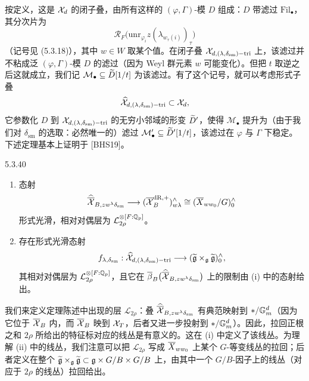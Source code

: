 按定义，这是 $\mathcal{X}_d$ 的闭子叠，由所有这样的 $(\varphi,\Gamma)$-模 $D$ 组成：$D$ 带滤过 $\mathrm{Fil}_\bullet$，其分次片为
\[
\mathcal{R}_F\bigl(\mathrm{unr}_{\varphi_i}z(\lambda_{w_\tau(i)})_\tau\bigr)
\]
（记号见 (5.3.18)），其中 $w\in W$ 取某个值。在闭子叠 $\mathcal{X}_{d,(\lambda,\delta_{\mathrm{sm}})-\mathrm{tri}}$ 上，该滤过并不粘成泛 $(\varphi,\Gamma)$-模 $D$ 的滤过（因为 Weyl 群元素 $w$ 可能变化）。但把 $t$ 取逆之后这就成立，我们记 $\mathcal{M}_\bullet\subseteq\widetilde D[1/t]$ 为该滤过。有了这个记号，就可以考虑形式子叠
\[
\widehat{\mathcal{X}}_{d,(\lambda,\delta_{\mathrm{sm}})-\mathrm{tri}}\subset\mathcal{X}_d,
\]
它参数化 $D$ 到 $\mathcal{X}_{d,(\lambda,\delta_{\mathrm{sm}})-\mathrm{tri}}$ 的无穷小邻域的形变 $\widetilde D'$，使得 $\mathcal{M}_\bullet$ 提升为（由于我们对 $\delta_{\mathrm{sm}}$ 的选取：必然唯一的）滤过 $\mathcal{M}'_\bullet\subseteq\widetilde D'[1/t]$，该滤过在 $\varphi$ 与 $\Gamma$ 下稳定。下述定理基本上证明于 [BHS19]。

\begin{thm}{5.3.40}\label{thm:a4-5-3-40}
\begin{enumerate}[label=(\roman*),leftmargin=2.2em,itemsep=0.2em]
\item 态射
\[
\widehat{\overline{\mathcal{X}}}_{B,zw^\lambda\delta_{\mathrm{sm}}}\longrightarrow(\overline{\mathcal{X}}_B^{\mathrm{dR},+})^{\wedge}_{w\lambda}\cong(\overline X_{ww_0}/G)^{\wedge}_0
\]
形式光滑，相对对偶层为 $\mathcal{L}_{2\rho}^{\otimes[F:\mathbb{Q}_p]}$。
\item 存在形式光滑态射
\[
f_{\lambda,\delta_{\mathrm{sm}}}:\widehat{\mathcal{X}}_{d,(\lambda,\delta_{\mathrm{sm}})-\mathrm{tri}}\longrightarrow(\widetilde{\mathfrak{g}}\times_{\mathfrak{g}}\widetilde{\mathfrak{g}})^{\wedge}_0,
\]
其相对对偶层为 $\mathcal{L}_{2\rho}^{\otimes[F:\mathbb{Q}_p]}$，且它在 $\overline\beta_B\bigl(\widehat{\overline{\mathcal{X}}}_{B,zw^\lambda\delta_{\mathrm{sm}}}\bigr)$ 上的限制由 (i) 中的态射给出。
\end{enumerate}
\end{thm}

我们来定义定理陈述中出现的层 $\mathcal{L}_{2\rho}$：叠 $\widehat{\overline{\mathcal{X}}}_{B,zw^\lambda\delta_{\mathrm{sm}}}$ 有典范映射到 $*/\mathbb{G}_m^d$（因为它位于 $\overline{\mathcal{X}}_B$ 内，而 $\overline{\mathcal{X}}_B$ 映到 $\mathcal{X}_T$，后者又进一步投射到 $*/\mathbb{G}_m^d$）。因此，拉回正根之和 $2\rho$ 所给出的特征标对应的线丛是有意义的。这在 (i) 中定义了该线丛。为理解 (ii) 中的线丛，我们注意可以把 $\mathcal{L}_{2\rho}$ 写成 $\overline X_{ww_0}$ 上某个 $G$-等变线丛的拉回；后者定义在整个 $\widetilde{\mathfrak{g}}\times_{\mathfrak{g}}\widetilde{\mathfrak{g}}\subset\mathfrak{g}\times G/B\times G/B$ 上，由其中一个 $G/B$-因子上的线丛（对应于 $2\rho$ 的线丛）拉回给出。

